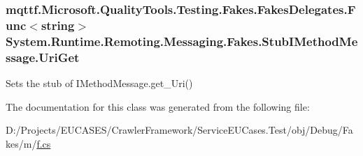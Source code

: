 \hypertarget{class_system_1_1_runtime_1_1_remoting_1_1_messaging_1_1_fakes_1_1_stub_i_method_message_a4e0b181c42aead8abc7cda64183f0b28}{
\subsubsection[{Uri\-Get}]{\setlength{\rightskip}{0pt plus 5cm}mqttf.\-Microsoft.\-Quality\-Tools.\-Testing.\-Fakes.\-Fakes\-Delegates.\-Func$<$string$>$ System.\-Runtime.\-Remoting.\-Messaging.\-Fakes.\-Stub\-I\-Method\-Message.\-Uri\-Get}}\label{class_system_1_1_runtime_1_1_remoting_1_1_messaging_1_1_fakes_1_1_stub_i_method_message_a4e0b181c42aead8abc7cda64183f0b28}


Sets the stub of I\-Method\-Message.\-get\-\_\-\-Uri()



The documentation for this class was generated from the following file\-:\begin{DoxyCompactItemize}
\item 
D\-:/\-Projects/\-E\-U\-C\-A\-S\-E\-S/\-Crawler\-Framework/\-Service\-E\-U\-Cases.\-Test/obj/\-Debug/\-Fakes/m/\hyperlink{m_2f_8cs}{f.\-cs}\end{DoxyCompactItemize}
